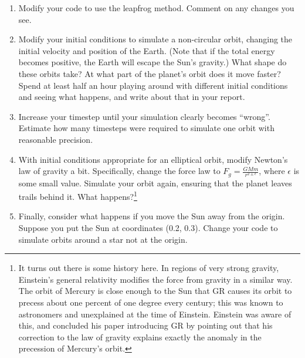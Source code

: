 \documentclass[12pt]{article}
\begin{document}
\begin{enumerate}
{or in Python

\begin{verbatim}
	print("T 0.9 -0.9\nEnergy (U + V = E): %e + %e = %e" % (potential,kinetic,potential+kinetic))
\end{verbatim}

	(Notice that this is a {\it two-line} anim command: the first line ({\tt T 0.9 -0.9}) instructs the computer to print some text at a specified point in the window,
	 in this case near the top left. The second line contains the text to be printed.) Remember, the more information you have about what your code is doing, the more
	  physics you can learn from it, and the easier it will be to fix bugs.

      }


\item{Modify your code to use the leapfrog method. Comment on any changes you see.}

\item{Modify your initial conditions to simulate a non-circular orbit, changing the initial velocity and position of the Earth. (Note that if the total energy becomes positive, the Earth will escape the Sun's gravity.) What shape do these orbits take? At what part of the planet's orbit does it move faster? Spend at 
  least half an hour playing around with different initial conditions and seeing
    what happens, and write about that in your report.}



\item Increase your timestep until your simulation clearly becomes ``wrong''. Estimate how many timesteps were required to 
simulate one orbit with reasonable precision.

    \item With initial conditions appropriate for an elliptical orbit, modify Newton's law of gravity a bit. Specifically, change the force law to $F_g = \frac{GMm}{r^{2 \pm \epsilon}}$, where $\epsilon$ is some small value. Simulate your orbit again, ensuring that the planet leaves trails behind it. What happens?\footnote{
      It turns out there is some history here. In regions of very strong gravity, Einstein's general relativity modifies the force from gravity in a similar way. The orbit of 
	Mercury is close enough to the Sun that GR causes its orbit to precess about one percent of one degree every century; this was known to astronomers and unexplained at the
	time of Einstein. Einstein was aware of this, and concluded his paper introducing GR by pointing out that his correction to the law of gravity explains exactly the 
	anomaly in the precession of Mercury's orbit.}



	\item{Finally, consider what happens if you move the Sun away from the origin. Suppose you put the Sun at coordinates (0.2, 0.3). Change your code to simulate orbits around a star not at the origin.}

	\end{enumerate}

	
\end{document}
